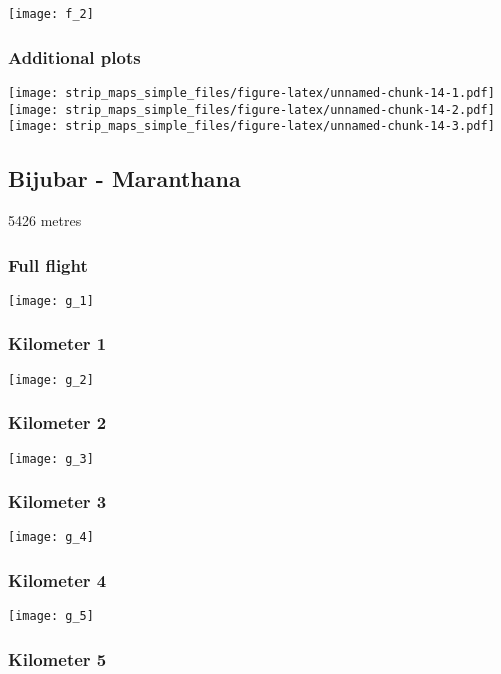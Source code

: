 \documentclass[]{article}
\begin{document}
\texttt{[image: f\_2]}

\subsubsection{Additional plots}\label{additional-plots-5}

\texttt{[image: strip\_maps\_simple\_files/figure-latex/unnamed-chunk-14-1.pdf]}
\texttt{[image: strip\_maps\_simple\_files/figure-latex/unnamed-chunk-14-2.pdf]}
\texttt{[image: strip\_maps\_simple\_files/figure-latex/unnamed-chunk-14-3.pdf]}

\newpage

\subsection{Bijubar - Maranthana}\label{bijubar---maranthana}

5426 metres

\subsubsection{Full flight}\label{full-flight-6}

\texttt{[image: g\_1]}

\subsubsection{Kilometer 1}\label{kilometer-1-6}

\texttt{[image: g\_2]}

\subsubsection{Kilometer 2}\label{kilometer-2-6}

\texttt{[image: g\_3]}

\subsubsection{Kilometer 3}\label{kilometer-3-6}

\texttt{[image: g\_4]}

\subsubsection{Kilometer 4}\label{kilometer-4-6}

\texttt{[image: g\_5]}

\subsubsection{Kilometer 5}\label{kilometer-5-6}
\end{document}
